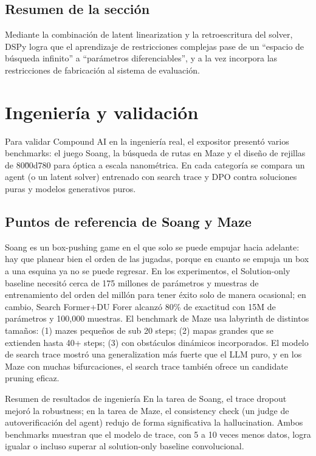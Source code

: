 \documentclass[a4paper]{article}
\begin{document}
\subsection{Resumen de la sección}

Mediante la combinación de latent linearization y la retroescritura del solver, DSPy logra que el aprendizaje de restricciones complejas pase de un ``espacio de búsqueda infinito'' a ``parámetros diferenciables'', y a la vez incorpora las restricciones de fabricación al sistema de evaluación.

\section{Ingeniería y validación}

Para validar Compound AI en la ingeniería real, el expositor presentó varios benchmarks: el juego Soang, la búsqueda de rutas en Maze y el diseño de rejillas de 80\u00d780 para óptica a escala nanométrica. En cada categoría se compara un agent (o un latent solver) entrenado con search trace y DPO contra soluciones puras y modelos generativos puros.

\subsection{Puntos de referencia de Soang y Maze}

Soang es un box-pushing game en el que solo se puede empujar hacia adelante: hay que planear bien el orden de las jugadas, porque en cuanto se empuja un box a una esquina ya no se puede regresar. En los experimentos, el Solution-only baseline necesitó cerca de 175 millones de parámetros y muestras de entrenamiento del orden del millón para tener éxito solo de manera ocasional; en cambio, Search Former+DU Forer alcanzó 80\% de exactitud con 15M de parámetros y 100,000 muestras.
El benchmark de Maze usa labyrinth de distintos tamaños: (1) mazes pequeños de sub 20 steps; (2) mapas grandes que se extienden hasta 40+ steps; (3) con obstáculos dinámicos incorporados. El modelo de search trace mostró una generalization más fuerte que el LLM puro, y en los Maze con muchas bifurcaciones, el search trace también ofrece un candidate pruning eficaz.
\begin{knowledgebox}{Resumen de resultados de ingeniería}
En la tarea de Soang, el trace dropout mejoró la robustness; en la tarea de Maze, el consistency check (un judge de autoverificación del agent) redujo de forma significativa la hallucination. Ambos benchmarks muestran que el modelo de trace, con 5 a 10 veces menos datos, logra igualar o incluso superar al solution-only baseline convolucional.
\end{knowledgebox}
\end{document}
